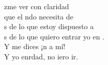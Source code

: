 \begin{cancion}%
	zme ver con claridad\\
	que el ndo necesita de \\
	s de lo que estoy dispuesto a  \\
	s de lo que quiero entrar yo en . \\
	Y  me dices ¡n a mí!  \\
	Y yo enrdad, no iero ir.\\
\end{cancion}%
